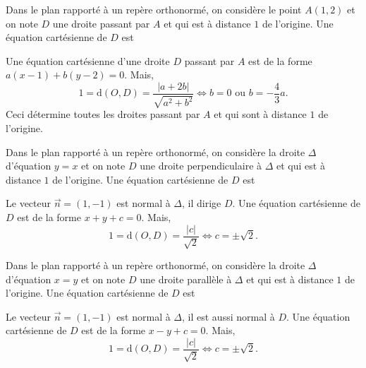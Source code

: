 \begin{question}
Dans le plan rapporté à un repère orthonormé, on considère le point $\displaystyle A(1,2)$ et on note $D$ une droite passant par $A$ et qui est à distance $1$ de l'origine. Une équation cartésienne de $D$ est
\begin{answers}  
\end{answers}
\begin{explanations}
Une équation cartésienne d'une droite $D$ passant par $A$ est de la forme $a(x-1)+b(y-2)=0$. Mais,
$$1=\mbox{d}(O,D)=\frac{|a+2b|}{\sqrt{a^2+b^2}}\Leftrightarrow b=0\mbox{ ou }b=-\frac{4}{3}a.$$
Ceci détermine toutes les droites passant par $A$ et qui sont à distance $1$ de l'origine.
\end{explanations}
\end{question}


\begin{question}
Dans le plan rapporté à un repère orthonormé, on considère la droite $\Delta$ d'équation $y=x$ et on note $D$ une droite perpendiculaire à $\Delta$ et qui est à distance $1$ de l'origine. Une équation cartésienne de $D$ est
\begin{answers}  
\end{answers}
\begin{explanations}
Le vecteur $\vec{n}=(1,-1)$ est normal à $\Delta$, il dirige $D$. Une équation cartésienne de $D$ est de la forme $x+y+c=0$. Mais,
$$1=\mbox{d}(O,D)=\frac{|c|}{\sqrt{2}}\Leftrightarrow c=\pm \sqrt{2}.$$
\end{explanations}
\end{question}


\begin{question}
Dans le plan rapporté à un repère orthonormé, on considère la droite $\Delta$ d'équation $x=y$ et on note $D$ une droite parallèle à $\Delta$ et qui est à distance $1$ de l'origine. Une équation cartésienne de $D$ est
\begin{answers}  
\end{answers}
\begin{explanations}
Le vecteur $\vec{n}=(1,-1)$ est normal à $\Delta$, il est aussi normal à $D$. Une équation cartésienne de $D$ est de la forme $x-y+c=0$. Mais,
$$1=\mbox{d}(O,D)=\frac{|c|}{\sqrt{2}}\Leftrightarrow c=\pm \sqrt{2}.$$
\end{explanations}
\end{question}



